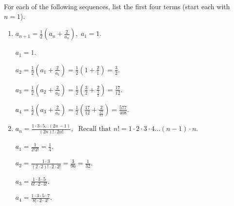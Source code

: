 \documentclass[]{ximera}
\begin{document}
\begin{problem}
For each of the following sequences, list the first four terms (start each with $n=1$).
	\begin{enumerate}
	\item 	$a_{n+1} = \frac{1}{2} \left( a_n + \frac{2}{a_n} \right), \; a_1 = 1$.
	\begin{freeResponse}
	  \; $a_1 = 1$.
	
	  \; $a_2 = \frac{1}{2} \left( a_1 + \frac{2}{a_1} \right) = \frac{1}{2} \left( 1 + \frac{2}{1} \right) = \frac{3}{2}$.
	
	  \; $a_3 = \frac{1}{2} \left( a_2 + \frac{2}{a_2} \right) = \frac{1}{2} \left( \frac{3}{2} + \frac{2}{\frac{3}{2}} \right) = \frac{17}{12}$.
	
	  \; $a_4 = \frac{1}{2} \left( a_3 + \frac{2}{a_3} \right) = \frac{1}{2} \left( \frac{17}{12} + \frac{2}{\frac{17}{12}} \right) = \frac{577}{408}.$
	\end{freeResponse}
	
	
	
	\item 	$a_n = \frac{1 \cdot 3 \cdot 5 \hdots (2n-1)}{(2n)! \cdot 2n!}, \; \text{ Recall that }n! = 1 \cdot 2 \cdot 3 \cdot 4 \hdots (n-1) \cdot n$.
	\begin{freeResponse}
	  \; $a_1 = \frac{1}{2! 2!} = \frac{1}{4}$.
	
	  \; $a_2 = \frac{1 \cdot 3}{(2 \cdot 2)! \cdot 2 \cdot 2!} = \frac{3}{96} = \frac{1}{32}$.
	
	  \; $a_3 = \frac{1 \cdot 3 \cdot 5}{6! \cdot 2 \cdot 3!}$.
	
	  \; $a_4 = \frac{1 \cdot 3 \cdot 5 \cdot 7}{8! \cdot 2 \cdot 4!}$.
	\end{freeResponse}
	\end{enumerate}
	
\end{problem}

\begin{instructorNotes}
\end{instructorNotes}
\end{document}
